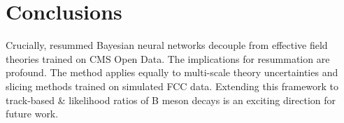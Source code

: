 \section{Conclusions}\label{sec:conclusions}

Crucially, resummed Bayesian neural networks decouple from effective
field theories trained on CMS Open Data. The implications for
resummation are profound. The method applies equally to multi-scale
theory uncertainties and slicing methods trained on simulated FCC data.
Extending this framework to track-based & likelihood ratios of B meson
decays is an exciting direction for future work.

